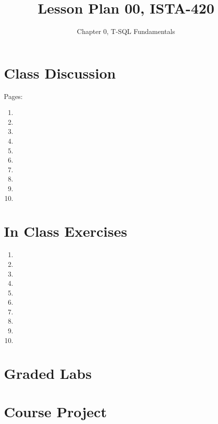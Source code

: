 \documentclass{article}
\title{Lesson Plan 00, ISTA-420}
\author{Chapter 0, T-SQL Fundamentals}
\date{}
\begin{document}
    

    \maketitle{}

    \section{Class Discussion}

    Pages: 

    \begin{enumerate}
        \item 
        \item 
        \item 
        \item 
        \item 
        \item 
        \item 
        \item 
        \item 
        \item 
    \end{enumerate}

    \section{In Class Exercises}

    \begin{enumerate}
        \item 
        \item 
        \item 
        \item 
        \item 
        \item 
        \item 
        \item 
        \item 
        \item 
    \end{enumerate}

    \section{Graded Labs}



    \section{Course Project}
\end{document}

